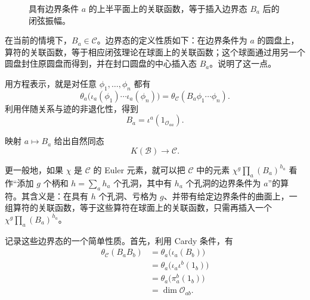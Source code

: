 \begin{figure}[H]
\centering
{}
\caption{具有边界条件 $a$ 的上半平面上的关联函数，等于插入边界态 $B_a$ 后的闭弦振幅。}\label{fig:2.14}
\end{figure}

在当前的情境下，$B_a\in\mathcal{C}$。边界态的定义性质如下：在边界条件为 $a$ 的圆盘上，算符的关联函数，等于相应闭弦理论在球面上的关联函数；这个球面通过用另一个圆盘封住原圆盘而得到，并在封口圆盘的中心插入态 $B_a$。说明了这一点。

用方程表示，就是对任意 $\phi_1,\ldots,\phi_n$ 都有
\begin{equation}\label{eq:2.50}
\theta_a\bigl(\iota_a(\phi_1)\cdots\iota_a(\phi_n)\bigr)
=\theta_{\mathcal{C}}(B_a\phi_1\cdots\phi_n).
\end{equation}
利用伴随关系与迹的非退化性，得到
\begin{equation}\label{eq:2.51}
B_a=\iota^a(1_{\mathcal{O}_{aa}}).
\end{equation}

映射 $a\mapsto B_a$ 给出自然同态
\begin{equation}\label{eq:2.52}
K(\mathcal{B})\longrightarrow\mathcal{C}.
\end{equation}

更一般地，如果 $\chi$ 是 $\mathcal{C}$ 的 Euler 元素，就可以把 $\mathcal{C}$ 中的元素 $\chi^g\prod_a(B_a)^{h_a}$ 看作“添加 $g$ 个柄和 $h=\sum_a h_a$ 个孔洞，其中有 $h_a$ 个孔洞的边界条件为 $a$”的算符。其含义是：在具有 $h$ 个孔洞、亏格为 $g$、并带有给定边界条件的曲面上，一组算符的关联函数，等于这些算符在球面上的关联函数，只需再插入一个 $\chi^g\prod_a(B_a)^{h_a}$。

记录这些边界态的一个简单性质。首先，利用 Cardy 条件，有
\begin{equation}\label{eq:2.53}
\begin{aligned}
\theta_{\mathcal{C}}(B_aB_b)
&=\theta_a\bigl(\iota_a(B_b)\bigr)\\
&=\theta_a\bigl(\iota_a\iota^b(1_b)\bigr)\\
&=\theta_a\bigl(\pi_a^b(1_b)\bigr)\\
&=\dim\mathcal{O}_{ab}.
\end{aligned}
\end{equation}

